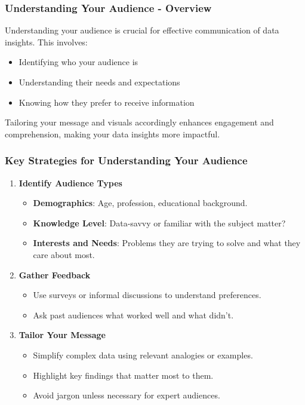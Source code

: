 \documentclass{beamer}
\begin{document}
\begin{frame}[fragile]
    \frametitle{Understanding Your Audience - Overview}

    Understanding your audience is crucial for effective communication of data insights. This involves:
    \begin{itemize}
        \item Identifying who your audience is
        \item Understanding their needs and expectations
        \item Knowing how they prefer to receive information
    \end{itemize}
    
    Tailoring your message and visuals accordingly enhances engagement and comprehension, making your data insights more impactful.
\end{frame}

\begin{frame}[fragile]
    \frametitle{Key Strategies for Understanding Your Audience}

    \begin{enumerate}
        \item \textbf{Identify Audience Types}
        \begin{itemize}
            \item \textbf{Demographics}: Age, profession, educational background.
            \item \textbf{Knowledge Level}: Data-savvy or familiar with the subject matter?
            \item \textbf{Interests and Needs}: Problems they are trying to solve and what they care about most.
        \end{itemize}
        \item \textbf{Gather Feedback}
        \begin{itemize}
            \item Use surveys or informal discussions to understand preferences.
            \item Ask past audiences what worked well and what didn’t.
        \end{itemize}
        \item \textbf{Tailor Your Message}
        \begin{itemize}
            \item Simplify complex data using relevant analogies or examples.
            \item Highlight key findings that matter most to them.
            \item Avoid jargon unless necessary for expert audiences.
        \end{itemize}
    \end{enumerate}
\end{frame}
\end{document}
